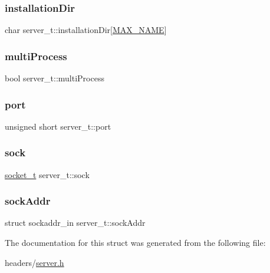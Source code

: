 \mbox{\label{structserver__t_ae5ccab8bd0fb6744f89ae6a7e13d8553}} 
\subsubsection{\texorpdfstring{installation\+Dir}{installationDir}}
{\footnotesize\ttfamily char server\+\_\+t\+::installation\+Dir\mbox{[}\hyperlink{datatypes_8h_ac7c0207aa5a0e10d378be03b68041350}{M\+A\+X\+\_\+\+N\+A\+ME}\mbox{]}}

\mbox{\label{structserver__t_a04e5158f927016ae6577600862d8750d}} 
\subsubsection{\texorpdfstring{multi\+Process}{multiProcess}}
{\footnotesize\ttfamily bool server\+\_\+t\+::multi\+Process}

\mbox{\label{structserver__t_ac60a631d2267e34f3b5dd3555ae3ab43}} 
\subsubsection{\texorpdfstring{port}{port}}
{\footnotesize\ttfamily unsigned short server\+\_\+t\+::port}

\mbox{\label{structserver__t_a51c1726304d4644523c35656c5f9b20b}} 
\subsubsection{\texorpdfstring{sock}{sock}}
{\footnotesize\ttfamily \hyperlink{datatypes_8h_a30353f381f5fccbb956eea1f3a110b6c}{socket\+\_\+t} server\+\_\+t\+::sock}

\mbox{\label{structserver__t_a515d831aa349c908c0a2c0e86b5e1c43}} 
\subsubsection{\texorpdfstring{sock\+Addr}{sockAddr}}
{\footnotesize\ttfamily struct sockaddr\+\_\+in server\+\_\+t\+::sock\+Addr}



The documentation for this struct was generated from the following file\+:\begin{DoxyCompactItemize}
\item 
headers/\hyperlink{server_8h}{server.\+h}\end{DoxyCompactItemize}

